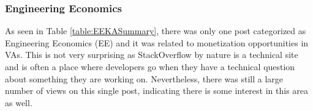 \documentclass{sigchi}
\begin{document}
\subsubsection{Engineering Economics}

\begin{table}[H] %
\centering
\caption{Summary of subcategories and their accompanying demographic information for the Engineering Economics SWEBOK KA}
\label{table:EEKASummary}
\end{table}
As seen in Table \ref{table:EEKASummary}, there was only one post categorized as Engineering Economics (EE) and it was related to monetization opportunities in VAs. This is not very surprising as StackOverflow by nature is a technical site and is often a place where developers go when they have a technical question about something they are working on. Nevertheless, there was still a large number of views on this single post, indicating there is some interest in this area as well.
\end{document}
